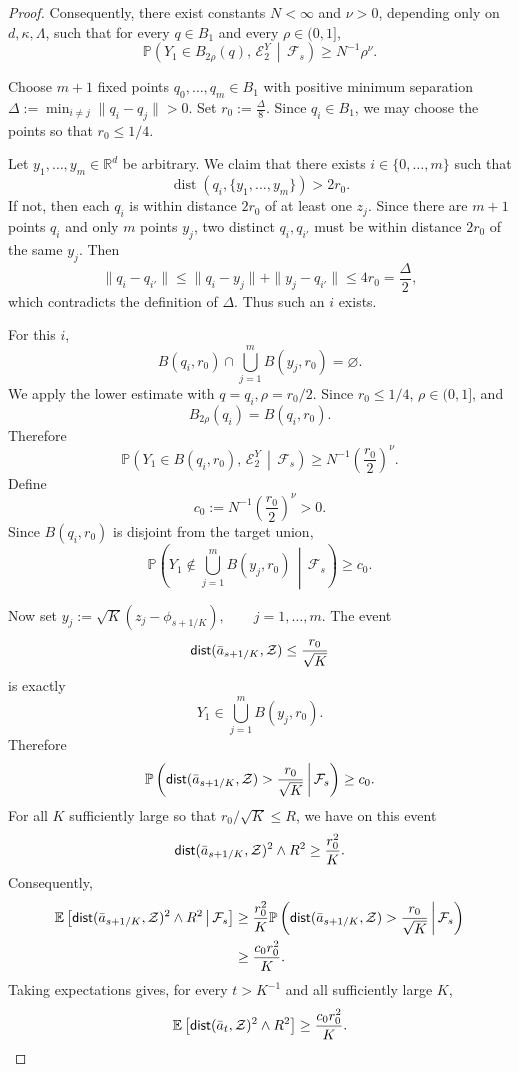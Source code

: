 \documentclass{article}
\newcommand{\1}{\mathbbm{1}}
\newcommand{\dist}{{\sf dist}}
\numberwithin{equation}{section}
\begin{document}
\begin{proof}
Consequently, there exist constants $N<\infty$ and $\nu>0$, depending only
on $d,\kappa,\Lambda$, such that for every $q\in B_1$ and every
$\rho\in(0,1]$,
$$
\mathbb P\left(
Y_1\in B_{2\rho}(q),
\,
\mathcal{E}_{2}^{Y}
\,\middle|\,
\mathcal F_s
\right)
\ge
N^{-1}\rho^\nu .
$$

Choose $m+1$ fixed points
$
q_0,\ldots,q_m\in B_1
$
with positive minimum separation
$
\Delta:=\min_{i\ne j}\|q_i-q_j\|>0.
$
Set
$
r_0:=\frac{\Delta}{8}.
$
Since $q_i\in B_1$, we may choose the points so that $r_0\le 1/4$.

Let $y_1,\ldots,y_m\in\mathbb R^d$ be arbitrary. We claim that there exists
$i\in\{0,\ldots,m\}$ such that
$$
\operatorname{dist}(q_i,\{y_1,\ldots,y_m\})>2r_0.
$$
If not, then each $q_i$ is within distance $2r_0$ of at least one $z_j$.
Since there are $m+1$ points $q_i$ and only $m$ points $y_j$, two distinct
$q_i,q_{i'}$ must be within distance $2r_0$ of the same $y_j$. Then
$$
\|q_i-q_{i'}\|
\le
\|q_i-y_j\|+\|y_j-q_{i'}\|
\le
4r_0
=
\frac{\Delta}{2},
$$
which contradicts the definition of $\Delta$. Thus such an $i$ exists.

For this $i$,
$$
B(q_i,r_0)
\cap
\bigcup_{j=1}^m B(y_j,r_0)
=
\varnothing .
$$
We apply the lower estimate with
$
q=q_i,
\rho=r_{0}/2.
$
Since $r_0\le 1/4$, $\rho\in(0,1]$, and
$$
B_{2\rho}(q_i)=B(q_i,r_0).
$$
Therefore
$$
\mathbb P\left(
Y_1\in B(q_i,r_0),
\,
\mathcal{E}_{2}^{Y}
\,\middle|\,
\mathcal F_s
\right)
\ge
N^{-1}\left(\frac{r_0}{2}\right)^\nu .
$$
Define
$$
c_0:=N^{-1}\left(\frac{r_0}{2}\right)^\nu>0.
$$
Since $B(q_i,r_0)$ is disjoint from the target union,
$$
\mathbb P\left(
Y_1\notin \bigcup_{j=1}^m B(y_j,r_0)
\,\middle|\,
\mathcal F_s
\right)
\ge
c_0 .
$$

Now set
$
y_j
:=
\sqrt K\left(z_j-\phi_{s+1/K}\right),
\qquad
j=1,\ldots,m.
$
The event
$$
\dist(\bar a_{s+1/K},\mathcal{Z})\le \frac{r_0}{\sqrt K}
$$
is exactly
$$
Y_1\in \bigcup_{j=1}^m B(y_j,r_0).
$$
Therefore
$$
\mathbb P\left(
\dist(\bar a_{s+1/K},\mathcal{Z})> \frac{r_0}{\sqrt K}
\,\middle|\,
\mathcal F_s
\right)
\ge
c_0.
$$
For all $K$ sufficiently large so that $r_0/\sqrt K\le R$, we have on this
event
$$
\dist(\bar a_{s+1/K}, \mathcal{Z})^2\wedge R^2
\ge
\frac{r_0^2}{K}.
$$
Consequently,
$$
\begin{aligned}
\mathbb E\left[
\dist(\bar a_{s+1/K},\mathcal{Z})^2\wedge R^2
\,\middle|\,
\mathcal F_s
\right]
&\ge
\frac{r_0^2}{K}
\mathbb P\left(
\dist(\bar a_{s+1/K},\mathcal{Z})> \frac{r_0}{\sqrt K}
\,\middle|\,
\mathcal F_s
\right) \\
&\ge
\frac{c_0r_0^2}{K}.
\end{aligned}
$$
Taking expectations gives, for every $t>K^{-1}$ and all sufficiently large
$K$,
$$
\mathbb E\left[\dist(\bar a_t, \mathcal{Z})^2\wedge R^2\right]
\ge
\frac{c_0r_0^2}{K}.
$$


\end{proof}
\end{document}

